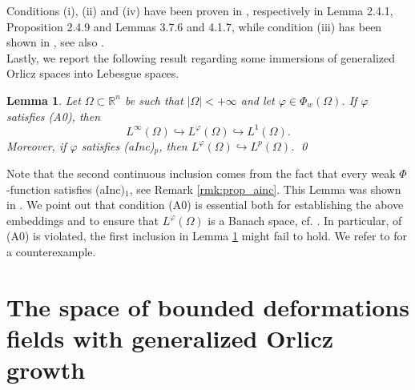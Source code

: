 \documentclass[a4paper,11pt,oneside,notitlepage]{article}
\newtheorem{lemma}[theorem]{Lemma}
\numberwithin{equation}{section}
\def\R{\mathbb{R}}
\newcommand{\vphi}{\varphi}
\begin{document}
Conditions (i), (ii) and (iv) have been proven in \cite{HaH}, respectively in Lemma 2.4.1, Proposition 2.4.9 and Lemmas 3.7.6 and 4.1.7, while condition (iii) has been shown in \cite[Corollary 2.6.3]{HHbook}, see also \cite[Proposition 2.4.5]{HaH}.
\\
Lastly, we report the following result regarding some immersions of generalized Orlicz spaces into Lebesgue spaces.

\begin{lemma}
\label{lmm:inclusions}
    Let $\Omega \subset \R^n$ be such that $|\Omega| < +\infty$ and let $\vphi \in \Phi_w(\Omega)$. If $\vphi$ satisfies (A0), then
    \begin{equation*}
        L^\infty(\Omega) \hookrightarrow L^\vphi(\Omega) \hookrightarrow L^1(\Omega).
    \end{equation*}
    Moreover, if $\vphi$ satisfies (aInc)$_p$, then $L^\vphi(\Omega) \hookrightarrow L^p(\Omega)$.
    \qed
\end{lemma}

Note that the second continuous inclusion comes from the fact that every weak $\Phi$-function satisfies (aInc)$_1$, see Remark \ref{rmk:prop_ainc}. This Lemma was shown in \cite[Corollary 3.7.9 \& Corollary 3.7.10]{HaH}. We point out that condition (A0) is essential both for establishing the above embeddings and to ensure that $L^\vphi(\Omega)$ is a Banach space, cf. \cite[Theorem 3.7.13]{HaH}. In particular, of (A0) is violated, the first inclusion in Lemma \ref{lmm:inclusions} might fail to hold. We refer to \cite[Example 3.7.11]{HaH} for a counterexample.


\section{The space of bounded deformations fields with generalized Orlicz growth}
\label{sec:funct_anal}
\end{document}

